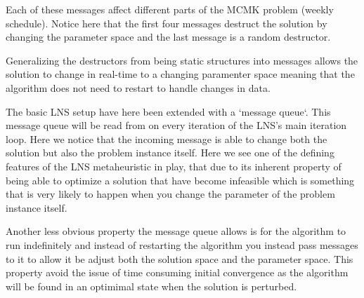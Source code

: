 \documentclass[preprint,12pt,authoryear]{elsarticle}
\begin{document}
Each of these messages affect different parts of the MCMK problem (weekly schedule). Notice
here that the first four messages destruct the solution by changing the parameter space and the last message is 
a random destructor.

Generalizing the destructors from being static structures into messages
allows the solution to change in real-time to a changing paramenter space meaning
that the algorithm does not need to restart to handle changes in data. 


	

The basic LNS setup have here been extended with a `message queue`. This message queue will be read from on every iteration of the LNS's main iteration loop. Here we notice that the 
incoming message is able to change both the solution but also the problem instance itself. Here we see one of the defining features of the LNS metaheuristic in play, that due to its inherent 
property of being able to optimize a solution that have become infeasible which is something that is very likely to happen when you change the parameter of the problem instance itself. 

Another less obvious property the message queue allows is for the algorithm to run indefinitely and instead of restarting the algorithm you instead pass 
messages to it to allow it be adjust both the solution space and the parameter space.
This property avoid the issue of time consuming initial convergence as the algorithm will be found in an optimimal state when the solution is perturbed.  
\end{document}
